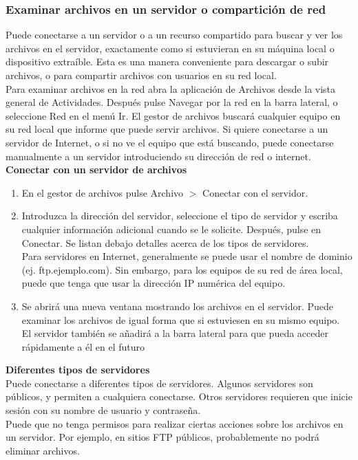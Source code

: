 \subsubsection{Examinar archivos en un servidor o compartición de red}
Puede conectarse a un servidor o a un recurso compartido para buscar y ver los archivos en el servidor, exactamente como si estuvieran en su máquina local o dispositivo extraíble. Esta es una manera conveniente para descargar o subir archivos, o para compartir archivos con usuarios en su red local.\\
Para examinar archivos en la red abra la aplicación de Archivos desde la vista general de Actividades. Después pulse Navegar por la red en la barra lateral, o seleccione Red en el menú Ir. El gestor de archivos buscará cualquier equipo en su red local que informe que puede servir archivos. Si quiere conectarse a un servidor de Internet, o si no ve el equipo que está buscando, puede conectarse manualmente a un servidor introduciendo su dirección de red o internet.\\

{\bf Conectar con un servidor de archivos}\\
\begin{enumerate}
\item En el gestor de archivos pulse Archivo $>$ Conectar con el servidor.
\item Introduzca la dirección del servidor, seleccione el tipo de servidor y escriba cualquier información adicional cuando se le solicite. Después, pulse en Conectar. Se listan debajo detalles acerca de los tipos de servidores.\\
Para servidores en Internet, generalmente se puede usar el nombre de dominio (ej. ftp.ejemplo.com). Sin embargo, para los equipos de su red de área local, puede que tenga que usar la dirección IP numérica del equipo.
\item Se abrirá una nueva ventana mostrando los archivos en el servidor. Puede examinar los archivos de igual forma que si estuviesen en su mismo equipo.\\

El servidor también se añadirá a la barra lateral para que pueda acceder rápidamente a él en el futuro
\end{enumerate}
{\bf Diferentes tipos de servidores}\\
Puede conectarse a diferentes tipos de servidores. Algunos servidores son públicos, y permiten a cualquiera conectarse. Otros servidores requieren que inicie sesión con su nombre de usuario y contraseña.\\
Puede que no tenga permisos para realizar ciertas acciones sobre los archivos en un servidor. Por ejemplo, en sitios FTP públicos, probablemente no podrá eliminar archivos.\\

